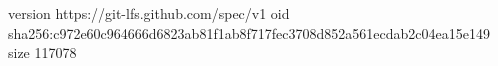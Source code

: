 version https://git-lfs.github.com/spec/v1
oid sha256:c972e60c964666d6823ab81f1ab8f717fec3708d852a561ecdab2c04ea15e149
size 117078

